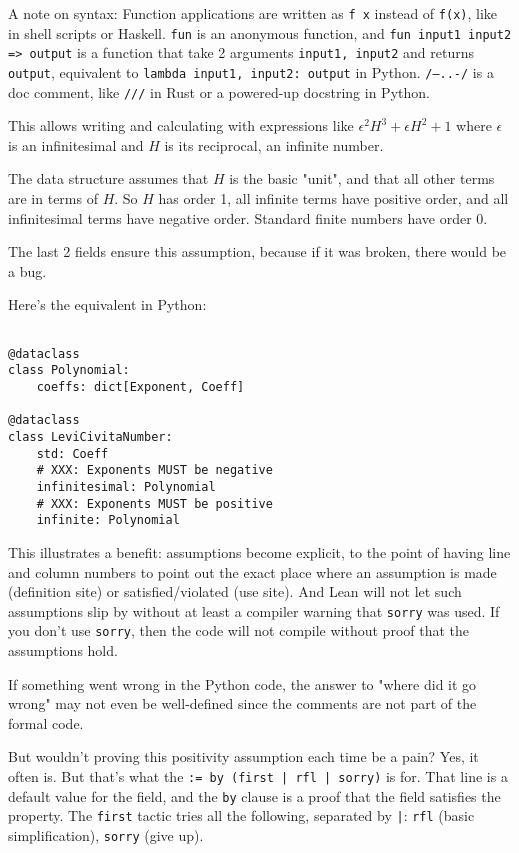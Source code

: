 \documentclass{article}
\begin{document}
A note on syntax: Function applications are written as \texttt{f x} instead of \texttt{f(x)}, like in shell scripts or Haskell. \texttt{fun} is an anonymous function, and \texttt{fun input1 input2 => output} is a function that take 2 arguments \texttt{input1, input2} and returns \texttt{output}, equivalent to \texttt{lambda input1, input2: output} in Python. \texttt{/--..-/} is a doc comment, like \texttt{///} in Rust or a powered-up docstring in Python.

This allows writing and calculating with expressions like $\epsilon^2 H^3 + \epsilon H^2 + 1$ where $\epsilon$ is an infinitesimal and $H$ is its reciprocal, an infinite number.

The data structure assumes that $H$ is the basic "unit", and that all other terms are in terms of $H$. So $H$ has order 1, all infinite terms have positive order, and all infinitesimal terms have negative order. Standard finite numbers have order 0.

The last 2 fields ensure this assumption, because if it was broken, there would be a bug.

Here's the equivalent in Python:

\begin{verbatim}

@dataclass
class Polynomial:
    coeffs: dict[Exponent, Coeff]

@dataclass
class LeviCivitaNumber:
    std: Coeff
    # XXX: Exponents MUST be negative
    infinitesimal: Polynomial
    # XXX: Exponents MUST be positive
    infinite: Polynomial
\end{verbatim}

This illustrates a benefit: assumptions become explicit, to the point of having line and column numbers to point out the exact place where an assumption is made (definition site) or satisfied/violated (use site). And Lean will not let such assumptions slip by without at least a compiler warning that \texttt{sorry} was used. If you don't use \texttt{sorry}, then the code will not compile without proof that the assumptions hold.

If something went wrong in the Python code, the answer to "where did it go wrong" may not even be well-defined since the comments are not part of the formal code.

But wouldn't proving this positivity assumption each time be a pain? Yes, it often is. But that's what the \texttt{:= by (first | rfl | sorry)} is for. That line is a default value for the field, and the \texttt{by} clause is a proof that the field satisfies the property. The \texttt{first} tactic tries all the following, separated by \texttt{|}: \texttt{rfl} (basic simplification), \texttt{sorry} (give up).
\end{document}
